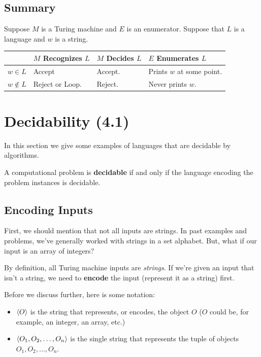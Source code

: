 \documentclass[letterpaper]{article}
\begin{document}
\subsection{Summary}
Suppose $M$ is a Turing machine and $E$ is an enumerator. Suppose that $L$ is a language and $w$ is a string.
\begin{center}
    \begin{tabular}{p{0.5in}|p{1.5in}|p{1.5in}|p{1.5in}}
            & $M$ Recognizes $L$ & $M$ Decides $L$ & $E$ Enumerates $L$ \\ 
        \hline 
        $w \in L$ & Accept & Accept. & Prints $w$ at some point. \\ 
        $w \notin L$ & Reject or Loop. & Reject. & Never prints $w$. 
    \end{tabular}
\end{center}





\newpage
\section{Decidability (4.1)} 
In this section we give some examples of languages that are decidable by algorithms. 

\bigskip 

A computational problem is \textbf{decidable} if and only if the language encoding the problem instances is decidable. 

\subsection{Encoding Inputs}
First, we should mention that not all inputs are strings. In past examples and problems, we've generally worked with strings in a set alphabet. But, what if our input is an array of integers? 

\bigskip 

By definition, all Turing machine inputs are \emph{strings}. If we're given an input that isn't a string, we need to \textbf{encode} the input (represent it as a string) first. 

\bigskip 

Before we discuss further, here is some notation: 
\begin{itemize}
    \item $\langle O \rangle$ is the string that represents, or encodes, the object $O$ ($O$ could be, for example, an integer, an array, etc.)
    \item $\langle O_1, O_2, \dots, O_n \rangle$ is the single string that represents the tuple of objects $O_1, O_2, \dots, O_n$. 
\end{itemize}
\end{document}
